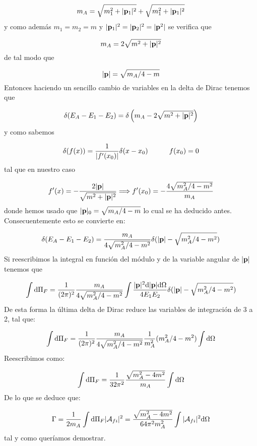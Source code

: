 \begin{solucion}
	\begin{equation*}
		m_A =\sqrt{m_1^2 + |\mathbf{p}_1|^2 }+\sqrt{m_1^2 + |\mathbf{p}_1|^2 }
	\end{equation*}
	y como además $m_1=m_2=m$ y $|\mathbf{p}_1|^2=|\mathbf{p}_2|^2=|\mathbf{p}^2|$ se verifica que
	
	\begin{equation*}
		m_A =2\sqrt{m^2 + |\mathbf{p}|^2 }
	\end{equation*}
	de tal modo que
	
	\begin{equation*}
		|\mathbf{p}| = \sqrt{m_A/4-m}
	\end{equation*}	
	Entonces haciendo un sencillo cambio de variables en la delta de Dirac tenemos que 
	
	\begin{equation*}
		\delta (E_A - E_1 - E_2) = \delta \left( m_A -2\sqrt{m^2 + |\mathbf{p}|^2 } \right)
	\end{equation*}
	y como sabemos 
	
	\begin{equation*}
		\delta (f(x)) = \frac{1}{|f'(x_0)|} \delta (x-x_0) \quad \quad \quad f(x_0)=0
	\end{equation*}
	tal que en nuestro caso
	
	\begin{equation*}
		f'(x) = -\frac{2|\mathbf{p}|}{\sqrt{m^2+|\mathbf{p}|^2}} \Longrightarrow f'(x_0) =- \frac{4\sqrt{m_A^2/4-m^2}}{m_A}
	\end{equation*}
	donde hemos usado que $	|\mathbf{p}|_0 = \sqrt{m_A/4-m}$ lo cual se ha deducido antes. Consecuentemente esto se convierte en:
	
	\begin{equation*}
		\delta (E_A - E_1 - E_2) = \frac{m_A}{4\sqrt{m_A^2/4-m^2}} \delta(|\mathbf{p}|- \sqrt{m_A^2/4-m^2})
	\end{equation*}
	Si reescribimos la integral en función del módulo y de la variable angular de $|\mathbf{p}|$ tenemos que
	
	\begin{equation*}
		\int \mathrm{d} \Pi_F = \frac{1}{(2\pi)^2}\frac{m_A}{4\sqrt{m_A^2/4-m^2}} \int  \frac{|\mathbf{p}|^2 \mathrm{d} |\mathbf{p}| \mathrm{d} \Omega}{4E_1E_2}  \delta(|\mathbf{p}|- \sqrt{m_A^2/4-m^2})
	\end{equation*}
	De esta forma la última delta de Dirac reduce las variables de integración de 3 a 2, tal que:
	
	\begin{equation*}
		\int \mathrm{d} \Pi_F = \frac{1}{(2\pi)^2}\frac{m_A}{4\sqrt{m_A^2/4-m^2}} \frac{1}{m_A^2}  
		(m_A^2/4 - m^2)	\int \mathrm{d} \Omega
	\end{equation*}
	Reescribimos como:
	
	\begin{equation*}
		\int \mathrm{d} \Pi_F = \frac{1}{32 \pi^2 } \frac{\sqrt{m_A^2-4m^2}}{m_A} \int \mathrm{d} \Omega
	\end{equation*}
	De lo que se deduce que:
	
	\begin{equation*}
		\Gamma = \frac{1}{2m_A} \int \mathrm{d} \Pi_F |\mathcal{A}_{fi}|^2 = \frac{\sqrt{m_A^2-4m^2}}{64\pi^2 m_A^2} \int |\mathcal{A}_{fi}|^2 \mathrm{d} \Omega
	\end{equation*}
	tal y como queríamos demostrar.
\end{solucion}

